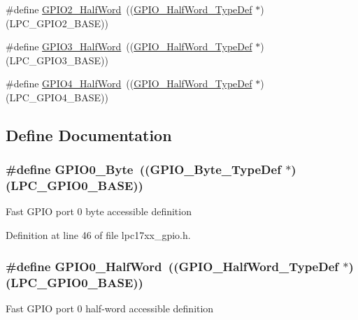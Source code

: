 \begin{DoxyCompactItemize}
\item 
\#define \hyperlink{group___g_p_i_o___public___macros_ga2bf1837541e93e32013115a2d60c9609}{\-G\-P\-I\-O2\-\_\-\-Half\-Word}~((\hyperlink{struct_g_p_i_o___half_word___type_def}{\-G\-P\-I\-O\-\_\-\-Half\-Word\-\_\-\-Type\-Def} $\ast$)(\-L\-P\-C\-\_\-\-G\-P\-I\-O2\-\_\-\-B\-A\-S\-E))
\item 
\#define \hyperlink{group___g_p_i_o___public___macros_gadb3ef5b918d80a4b0b70a0f0ff74fe5e}{\-G\-P\-I\-O3\-\_\-\-Half\-Word}~((\hyperlink{struct_g_p_i_o___half_word___type_def}{\-G\-P\-I\-O\-\_\-\-Half\-Word\-\_\-\-Type\-Def} $\ast$)(\-L\-P\-C\-\_\-\-G\-P\-I\-O3\-\_\-\-B\-A\-S\-E))
\item 
\#define \hyperlink{group___g_p_i_o___public___macros_ga6b21ef2ef759ab3165ef5031014266b0}{\-G\-P\-I\-O4\-\_\-\-Half\-Word}~((\hyperlink{struct_g_p_i_o___half_word___type_def}{\-G\-P\-I\-O\-\_\-\-Half\-Word\-\_\-\-Type\-Def} $\ast$)(\-L\-P\-C\-\_\-\-G\-P\-I\-O4\-\_\-\-B\-A\-S\-E))
\end{DoxyCompactItemize}


\subsection{\-Define \-Documentation}
\hypertarget{group___g_p_i_o___public___macros_ga283f46328b525142110cfd3d8a905b4b}{
\subsubsection[{\-G\-P\-I\-O0\-\_\-\-Byte}]{\setlength{\rightskip}{0pt plus 5cm}\#define {\bf \-G\-P\-I\-O0\-\_\-\-Byte}~(({\bf \-G\-P\-I\-O\-\_\-\-Byte\-\_\-\-Type\-Def} $\ast$)(\-L\-P\-C\-\_\-\-G\-P\-I\-O0\-\_\-\-B\-A\-S\-E))}}\label{group___g_p_i_o___public___macros_ga283f46328b525142110cfd3d8a905b4b}
\-Fast \-G\-P\-I\-O port 0 byte accessible definition 

\-Definition at line 46 of file lpc17xx\-\_\-gpio.\-h.

\hypertarget{group___g_p_i_o___public___macros_ga1ff064a592c57da00124bb63736c4125}{
\subsubsection[{\-G\-P\-I\-O0\-\_\-\-Half\-Word}]{\setlength{\rightskip}{0pt plus 5cm}\#define {\bf \-G\-P\-I\-O0\-\_\-\-Half\-Word}~(({\bf \-G\-P\-I\-O\-\_\-\-Half\-Word\-\_\-\-Type\-Def} $\ast$)(\-L\-P\-C\-\_\-\-G\-P\-I\-O0\-\_\-\-B\-A\-S\-E))}}\label{group___g_p_i_o___public___macros_ga1ff064a592c57da00124bb63736c4125}
\-Fast \-G\-P\-I\-O port 0 half-\/word accessible definition 

